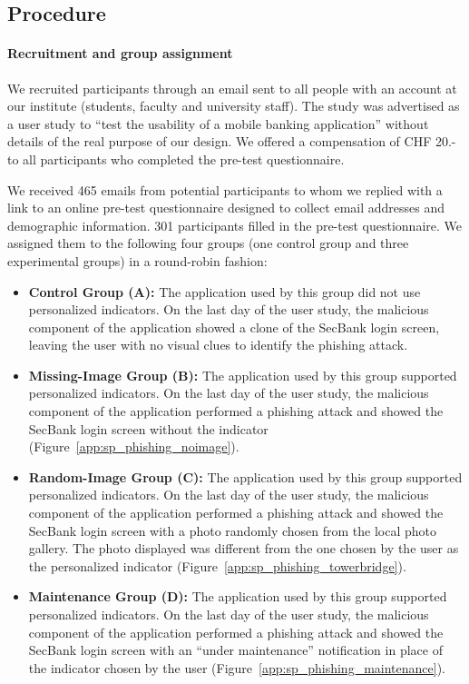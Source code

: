 \subsection{Procedure}

\paragraph{Recruitment and group assignment} We recruited participants through
an email sent to all people with an account at our institute (students, faculty
and university staff). The study was advertised as a user study to ``test the
usability of a mobile banking application'' without details of the real purpose
of our design. We offered a compensation of CHF 20.- to all participants who
completed the pre-test questionnaire.

We received 465 emails from potential participants to whom we replied with a
link to an online pre-test questionnaire designed to collect email addresses
and demographic information. 301 participants filled in the pre-test
questionnaire. We assigned them to the following four groups (one control group
and three experimental groups) in a round-robin fashion:

\begin{itemize}
  \item \textbf{Control Group (A):} The application used by this group did not use personalized indicators.
  On the last day of the user study, the malicious component of the application showed a clone of the SecBank login screen, leaving the user with no visual clues to identify the phishing attack.
  \item \textbf{Missing-Image Group (B):} The application used by this group supported personalized indicators.
  On the last day of the user study, the malicious component of the application performed a phishing attack and showed the SecBank login screen without the indicator (Figure~\ref{app:sp_phishing_noimage}).
  \item \textbf{Random-Image Group (C):} The application used by this group supported personalized indicators.
  On the last day of the user study, the malicious component of the application performed a phishing attack and showed the SecBank login screen with a photo randomly chosen from the local photo gallery. The photo displayed was different from the one chosen by the user as the personalized indicator (Figure~\ref{app:sp_phishing_towerbridge}).
  \item \textbf{Maintenance Group (D):} The application used by this group supported personalized indicators.
  On the last day of the user study, the malicious component of the application performed a phishing attack and showed the SecBank login screen with an ``under maintenance'' notification in place of the indicator chosen by the user (Figure~\ref{app:sp_phishing_maintenance}).
\end{itemize}

